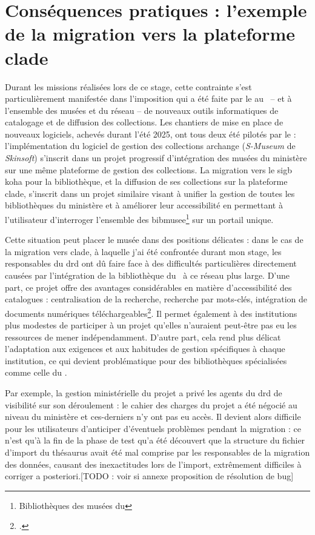 \section{\label{I-B-2}Conséquences pratiques : l'exemple de la migration vers la plateforme \acs{clade}}

Durant les missions réalisées lors de ce stage, cette contrainte s'est particulièrement manifestée dans l'imposition qui a été faite par le \minarm au \mae~-- et à l'ensemble des musées et \bibmusee du réseau -- de nouveaux outils informatiques de catalogage et de diffusion des collections. Les chantiers de mise en place de nouveaux logiciels, achevés durant l'été 2025, ont tous deux été pilotés par le \minarm : l'implémentation du logiciel de gestion des collections \gls{archange} (\textit{S-Museum} de \textit{Skinsoft}) s'inscrit dans un projet progressif d'intégration des musées du ministère sur une même plateforme de gestion des collections. La migration vers le \ac{sigb} \gls{koha} pour la bibliothèque, et la diffusion de ses collections sur la plateforme \gls{clade}, s'inscrit dans un projet similaire visant à unifier la gestion de toutes les bibliothèques du ministère et à améliorer leur accessibilité en permettant à l'utilisateur d'interroger l'ensemble des \gls{bibmusee}\footnote{Bibliothèques des musées du \minarm} sur un portail unique.

Cette situation peut placer le musée dans des positions délicates : dans le cas de la migration vers \gls{clade}, à laquelle j'ai été confrontée durant mon stage, les responsables du \ac{drd} ont dû faire face à des difficultés particulières directement causées par l'intégration de la bibliothèque du \mae~à ce réseau plus large. D'une part, ce projet offre des avantages considérables en matière d'accessibilité des catalogues : centralisation de la recherche, recherche par mots-clés, intégration de documents numériques téléchargeables\footcite{ministeredesarmeesKitCommunicationCLADE}. Il permet également à des institutions plus modestes de participer à un projet qu'elles n'auraient peut-être pas eu les ressources de mener indépendamment. D'autre part, cela rend plus délicat l'adaptation aux exigences et aux habitudes de gestion spécifiques à chaque institution, ce qui devient problématique pour des bibliothèques spécialisées comme celle du \mae.

Par exemple, la gestion ministérielle du projet a privé les agents du \ac{drd} de visibilité sur son déroulement : le cahier des charges du projet a été négocié au niveau du ministère et ces-derniers n'y ont pas eu accès. Il devient alors difficile pour les utilisateurs d'anticiper d'éventuels problèmes pendant la migration : ce n'est qu'à la fin de la phase de test qu'a été découvert que la structure du fichier d'import du thésaurus avait été mal comprise par les responsables de la migration des données, causant des inexactitudes lors de l'import, extrêmement difficiles à corriger a posteriori.[TODO : voir si annexe proposition de résolution de bug]

